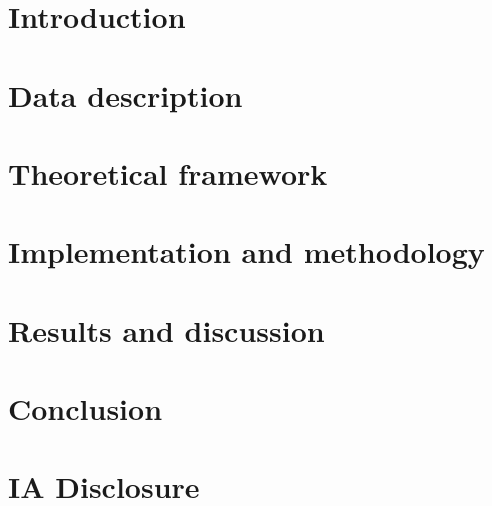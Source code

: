 \documentclass[10pt, twocolumn, a4paper]{article}
\begin{document}


\onecolumn

\newpage
\twocolumn

\section{Introduction}
\label{sec:introduction}


\section{Data description}
\label{sec:data}



\section{Theoretical framework}
\label{sec:theory}


\section{Implementation and methodology}
\label{sec:impl}






\section{Results and discussion}
\label{sec:results}



\section{Conclusion}
\label{sec:conclusion}








\section*{IA Disclosure}

\label{sec:ia_disclosure}



\end{document}
